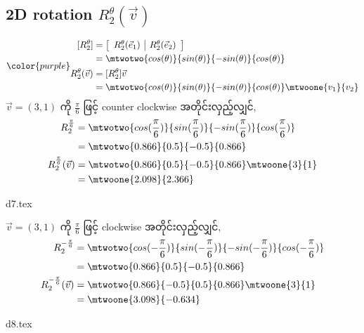 \subsection{2D rotation $R_2^\theta(\vec{v})$}
\begin{equation}
    {\color{purple}\begin{split}
        [R_2^\theta]&=\left[\begin{array}{c|c}
            R_2^\theta(\vec{e}_1) &  R_2^\theta(\vec{e}_2)
        \end{array}\right] \\
        &=\mtwotwo{cos(\theta)}{sin(\theta)}{-sin(\theta)}{cos(\theta)} \\
        R_2^\theta(\vec{v})&=[R_2^\theta]\vec{v} \\
        &=\mtwotwo{cos(\theta)}{sin(\theta)}{-sin(\theta)}{cos(\theta)}\mtwoone{v_1}{v_2}
    \end{split}}
\end{equation}
$\vec{v}=(3,1)$ ကို $\frac{\pi}{6}$ ဖြင့် counter clockwise အတိုင်းလှည့်လျှင်,
\[
    \begin{split}
        R_2^{\frac{\pi}{6}}&=\mtwotwo{cos(\frac{\pi}{6})}{sin(\frac{\pi}{6})}{-sin(\frac{\pi}{6})}{cos(\frac{\pi}{6})} \\
        &=\mtwotwo{0.866}{0.5}{-0.5}{0.866} \\
        R_2^{\frac{\pi}{6}}(\vec{v})&=\mtwotwo{0.866}{0.5}{-0.5}{0.866}\mtwoone{3}{1} \\
        &=\mtwoone{2.098}{2.366}
    \end{split}
\]
\begin{center}
    {d7.tex}
\end{center}
$\vec{v}=(3,1)$ ကို $\frac{\pi}{6}$ ဖြင့် clockwise အတိုင်းလှည့်လျှင်,
\[
    \begin{split}
        R_2^{-\frac{\pi}{6}}&=\mtwotwo{cos(-\frac{\pi}{6})}{sin(-\frac{\pi}{6})}{-sin(-\frac{\pi}{6})}{cos(-\frac{\pi}{6})} \\
        &=\mtwotwo{0.866}{0.5}{-0.5}{0.866} \\
        R_2^{-\frac{\pi}{6}}(\vec{v})&=\mtwotwo{0.866}{-0.5}{0.5}{0.866}\mtwoone{3}{1} \\
        &=\mtwoone{3.098}{-0.634}
    \end{split}
\]
\begin{center}
    {d8.tex}
\end{center}